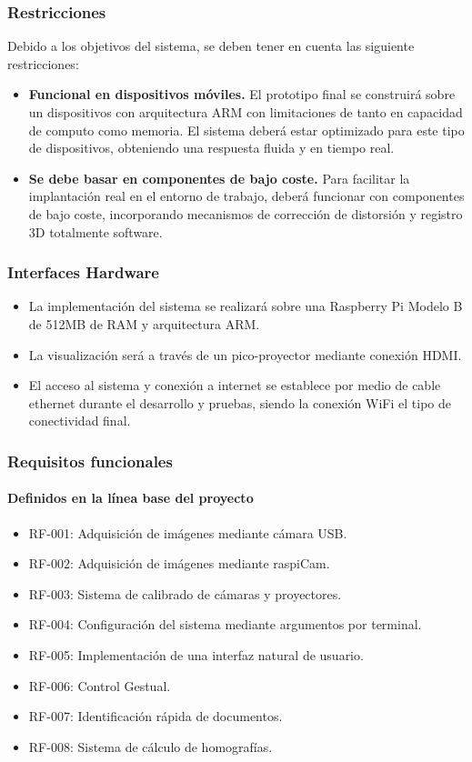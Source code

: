 \subsubsection{Restricciones}
Debido a los objetivos del sistema, se deben tener en cuenta las siguiente restricciones:
\begin{itemize}
\item\textbf{Funcional en dispositivos móviles.} El prototipo final se construirá sobre un dispositivos con arquitectura ARM con limitaciones de tanto en capacidad de computo como memoria. El sistema deberá estar optimizado para este tipo de dispositivos, obteniendo una respuesta fluida y en tiempo real.   
  
\item\textbf{Se debe basar en componentes de bajo coste.} Para facilitar la implantación real en el entorno de trabajo, deberá funcionar con componentes de bajo coste, incorporando mecanismos de corrección de distorsión y registro 3D totalmente software.
\end{itemize}

\subsubsection{Interfaces Hardware}
\begin{itemize}
\item La implementación del sistema se realizará sobre una Raspberry Pi Modelo B de 512MB de RAM y arquitectura ARM. 
\item La visualización será a través de un pico-proyector mediante conexión HDMI.
\item El acceso al sistema y conexión a internet se establece por medio de cable ethernet durante el desarrollo y pruebas, siendo la conexión WiFi el tipo de conectividad final.
\end{itemize}

\subsubsection{Requisitos funcionales}
\paragraph{Definidos en la línea base del proyecto}
\begin{itemize}
\item RF-001: Adquisición de imágenes mediante cámara USB.
\item RF-002: Adquisición de imágenes mediante raspiCam.
\item RF-003: Sistema de calibrado de cámaras y proyectores.
\item RF-004: Configuración del sistema mediante argumentos por terminal.
\item RF-005: Implementación de una interfaz natural de usuario.
\item RF-006: Control Gestual.
\item RF-007: Identificación rápida de documentos.
\item RF-008: Sistema de cálculo de homografías.
\end{itemize}


